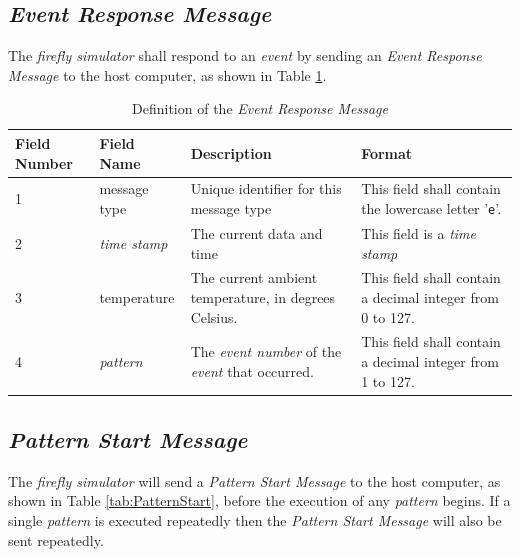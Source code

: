 \documentclass[letterpaper,11pt]{article}
\begin{document}
\subsection{\textit{Event Response Message}}

The \textit{firefly simulator} shall respond to an \textit{event}
by sending an \textit{Event Response Message} to the host computer,
as shown in Table \ref{tab:EventResponse}.

\begin{table}[H]
  \caption{Definition of the \textit{Event Response Message}}
  \centering
  \setlength\extrarowheight{2pt}
  \begin{tabular}[h]{|p{0.5in}|p{1.00in}|p{2.25in}|p{2.25in}|} \hline
    Field Number & Field Name & Description & Format \\ \hline
    1            & message type

    & Unique identifier for this message type
    & This field shall contain the lowercase letter '\texttt{e}'.
    \\ \hline
    2            & \textit{time stamp}
    & The current data and time
    & This field is a \textit{time stamp}
    \\ \hline
    3            & temperature
    & The current ambient temperature, in degrees Celsius.
    & This field shall contain a decimal integer from 0 to 127.
    \\ \hline
    4            & \textit{pattern}

    & The \textit{event number} of the \textit{event} that occurred.
    & This field shall contain a decimal integer from 1 to 127.
    \\ \hline
  \end{tabular}
  \label{tab:EventResponse}
\end{table}

\subsection{\textit{Pattern Start Message}}

The \textit{firefly simulator} will send a \textit{Pattern Start Message} to the
host computer, as shown in Table \ref{tab:PatternStart}, before the execution
of any \textit{pattern} begins. If a single \textit{pattern} is executed
repeatedly then the \textit{Pattern Start Message} will also be sent
repeatedly.
\end{document}
